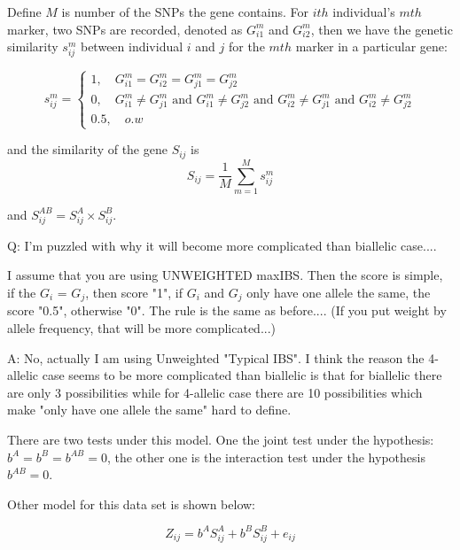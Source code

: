 \documentclass{article}
\begin{document}
        Define $M$ is number of the SNPs the gene contains. For $ith$ individual's $mth$ marker, two SNPs are recorded, denoted as $G_{i1}^m$ and $G_{i2}^m$, then we have the genetic similarity $s_{ij}^m$ between individual $i$ and $j$ for the $mth$ marker in a particular gene:

        \begin{equation*}
            s_{ij}^m=\begin{cases}
                1,\quad G_{i1}^m=G_{i2}^m=G_{j1}^m=G_{j2}^m \\
                0,\quad G_{i1}^m\neq G_{j1}^m \mbox{ and } G_{i1}^m\neq G_{j2}^m \mbox{ and } G_{i2}^m\neq G_{j1}^m \mbox{ and } G_{i2}^m\neq G_{j2}^m \\
                0.5,\quad o.w
         \end{cases}
        \end{equation*}

        and the similarity of the gene $S_{ij}$ is
        \[
            S_{ij}=\frac{1}{M}\sum^M_{m=1}s^m_{ij}
        \]

        and $S^{AB}_{ij}=S^A_{ij}\times S^B_{ij}$.\\        
        \begin{boxedminipage}{\textwidth}
            Q: I'm puzzled with why it will become more complicated than biallelic case....
            
            I assume that you are using UNWEIGHTED maxIBS. Then the score is simple, if the $G_i$ = $G_j$, then score "1", if $G_i$ and $G_j$ only have one allele the same, the score "0.5", otherwise "0". The rule is the same as before.... (If you put weight by allele frequency, that will be more complicated...)

            A: No, actually I am using Unweighted "Typical IBS". I think the reason the 4-allelic case seems to be more complicated than biallelic is that for biallelic there are only 3 possibilities while for 4-allelic case there are 10 possibilities which make "only have one allele the same" hard to define.
        \end{boxedminipage}
        
        
        There are two tests under this model. One the joint test under the hypothesis: $b^A=b^B=b^{AB}=0$, the other one is the interaction test under the hypothesis $b^{AB}=0$.

        Other model for this data set is shown below:

        \begin{equation*}
            Z_{ij}=b^AS_{ij}^A+b^BS_{ij}^B+e_{ij}
        \end{equation*}
\end{document}
